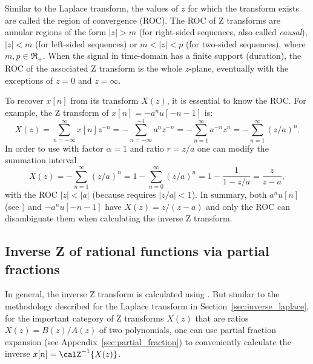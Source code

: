 Similar to the Laplace transform, the values of $z$ for which the transform exists are called the region of convergence (ROC). The ROC of Z transforms are annular regions of the form $|z| > m$ (for right-sided sequences, also called \emph{causal}), $|z|<m$ (for left-sided sequences) or $m < |z| < p$ (for two-sided sequences), where $m,p \in \Re_+$. When the signal in time-domain has a finite support (duration), the ROC of the associated Z transform is the whole $z$-plane, eventually with the exceptions of $z=0$ and $z=\infty$.

To recover $x[n]$ from its transform $X(z)$, it is essential to know the ROC.
For example, the Z transform of $x[n] = -a^n u[-n-1]$ is:
\[
X(z) = \sum_{n=-\infty}^\infty x[n] z^{-n} = -\sum_{n=-\infty}^{-1} a^n z^{-n} =
-\sum_{n=1}^\infty a^{-n} z^{n} = -\sum_{n=1}^\infty (z/a)^n.
\]
In order to use  with factor $\alpha=1$ and ratio $r=z/a$ one can modify the summation interval
\[
X(z) = -\sum_{n=1}^\infty (z/a)^n = 1 - \sum_{n=0}^\infty (z/a)^n = 1 - \frac{1}{1-z/a} = \frac{z}{z-a},
\]
with the ROC $|z|<|a|$ (because  requires $|z/a|<1$). In summary, both $a^nu[n]$ (see ) and $-a^n u[-n-1]$ have $X(z)=z/(z-a)$ and only the ROC can disambiguate them when calculating the inverse Z transform.

\subsection{Inverse Z of rational functions via partial fractions}
\label{sec:inverse_z}

In general, the inverse Z transform is calculated using .
But similar to the methodology described for the Laplace transform in Section~\ref{sec:inverse_laplace}, 
for the important category of Z transforms $X(z)$ that are ratios $X(z)=B(z)/A(z)$ of two polynomials,
one can use partial fraction expansion (see Appendix~\ref{sec:partial_fraction}) to conveniently calculate the inverse $x[n]=\calZ^{-1} \{ X(z) \}$.

